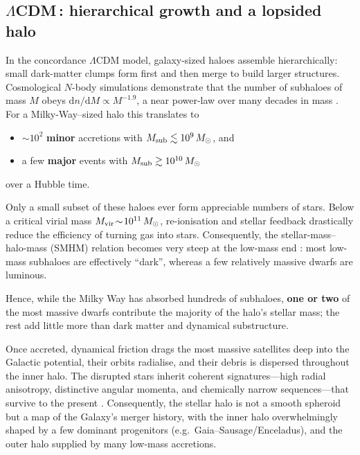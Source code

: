 \documentclass[a4paper,12pt]{article}
\begin{document}
\subsection{$\Lambda$CDM\,{\rm :} hierarchical growth and a lopsided halo}
\label{subsec:LCDM_halo}

In the concordance $\Lambda$CDM model, galaxy-sized haloes assemble hierarchically:  
small dark-matter clumps form first and then merge to build larger structures.  
Cosmological $N$-body simulations demonstrate that the number of subhaloes of mass $M$ obeys  
$\mathrm{d}n/\mathrm{d}M \propto M^{-1.9}$, a near power-law over many decades in mass  
\citep{Cooper2010,Fall2012}.  
For a Milky-Way–sized halo this translates to  
\begin{itemize}
    \item ${\sim}10^{2}$ \textbf{minor} accretions with $M_{\rm sub}\lesssim10^{9}\,M_\odot$, and 
    \item a few \textbf{major} events with $M_{\rm sub}\gtrsim10^{10}\,M_\odot$
\end{itemize}
over a Hubble time.  

Only a small subset of these haloes ever form appreciable numbers of stars.  
Below a critical virial mass $M_{\rm vir}\!\sim\!10^{11}\,M_\odot$, re-ionisation and stellar feedback
drastically reduce the efficiency of turning gas into stars.  
Consequently, the stellar-mass–halo-mass (SMHM) relation becomes very steep at the low-mass end  
\citep{Purcell2007,BullockBoylanKolchin2017}:  
most low-mass subhaloes are effectively ``dark'', whereas a few relatively massive dwarfs are luminous.  

Hence, while the Milky Way has absorbed hundreds of subhaloes,  
\textbf{one or two} of the most massive dwarfs contribute the majority of the halo’s stellar mass;  
the rest add little more than dark matter and dynamical substructure.  
 

Once accreted, dynamical friction drags the most massive satellites deep into the Galactic potential,  
their orbits radialise, and their debris is dispersed throughout the inner halo.  
The disrupted stars inherit coherent signatures—high radial anisotropy,  
distinctive angular momenta, and chemically narrow sequences—that survive to the present 
\citep[e.g.][]{HelmiDeZeeuw2000}.  
Consequently, the stellar halo is not a smooth spheroid but a map of the Galaxy’s merger history, 
with the inner halo overwhelmingly shaped by a few dominant progenitors (e.g.\ Gaia–Sausage/Enceladus), 
and the outer halo supplied by many low-mass accretions.
\end{document}
